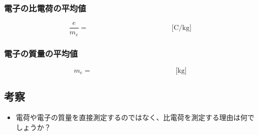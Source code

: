 \subsubsection*{電子の比電荷の平均値}

\[
\frac{e}{m_e} = \hspace{5cm} \text{[C/kg]}
\]

\subsubsection*{電子の質量の平均値}

\[
m_e = \hspace{5cm} \text{[kg]}
\]


\subsection*{考察}
\begin{itemize}
\item 電荷や電子の質量を直接測定するのではなく、比電荷を測定する理由は何でしょうか？
\end{itemize}

